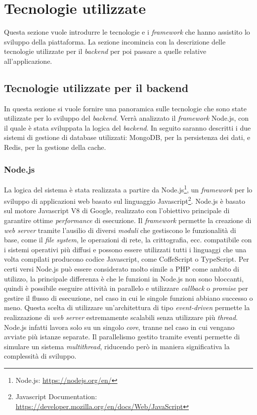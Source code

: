 \section{Tecnologie utilizzate}

Questa sezione vuole introdurre le tecnologie e i \emph{framework} che hanno assistito lo sviluppo della piattaforma. La sezione incomincia con la descrizione delle tecnologie utilizzate per il \emph{backend} per poi passare a quelle relative all'applicazione.

\subsection{Tecnologie utilizzate per il backend\label{sec:tecnologie-backend-background}}

In questa sezione si vuole fornire una panoramica sulle tecnologie che sono state utilizzate per lo sviluppo del \emph{backend}. Verrà analizzato il \emph{framework} Node.js, con il quale è stata sviluppata la logica del \emph{backend}. In seguito saranno descritti i due sistemi di gestione di database utilizzati: MongoDB, per la persistenza dei dati, e Redis, per la gestione della cache.

\subsubsection{Node.js}

La logica del sistema è stata realizzata a partire da Node.js\footnote{Node.js: \url{https://nodejs.org/en/}}, un \emph{framework} per lo sviluppo di applicazioni web basato sul linguaggio Javascript\footnote{Javascript Documentation: \url{https://developer.mozilla.org/en/docs/Web/JavaScript}}. Node.js è basato sul motore Javascript V8 di Google, realizzato con l'obiettivo principale di garantire ottime \emph{performance} di esecuzione. Il \emph{framework} permette la creazione di \emph{web server} tramite l'ausilio di diversi \emph{moduli} che gestiscono le funzionalità di base, come il \emph{file system}, le operazioni di rete, la crittografia, ecc. \upe compatibile con i sistemi operativi più diffusi e possono essere utilizzati tutti i linguaggi che una volta compilati producono codice Javascript, come CoffeScript o TypeScript. Per certi versi Node.js può essere considerato molto simile a PHP come ambito di utilizzo, la principale differenza è che le funzioni in Node.js non sono bloccanti, quindi è possibile eseguire attività in parallelo e utilizzare \emph{callback} o \emph{promise} per gestire il flusso di esecuzione, nel caso in cui le singole funzioni abbiano successo o meno. Questa scelta di utilizzare un'architettura di tipo \emph{event-driven} permette la realizzazione di \emph{web server} estremamente scalabili senza utilizzare più \emph{thread}. Node.js infatti lavora solo su un singolo \emph{core}, tranne nel caso in cui vengano avviate più istanze separate. Il parallelismo gestito tramite eventi permette di simulare un sistema \emph{multithread}, riducendo però in maniera significativa la complessità di sviluppo.

